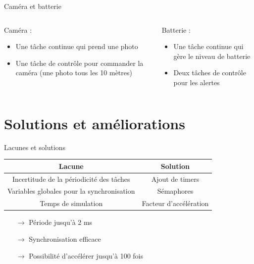 \documentclass{beamer}
\begin{document}
\begin{frame}{Caméra et batterie}

    \begin{columns}
    
        \begin{column}{0.45\paperwidth}
            Caméra :
            \begin{itemize}
                \item Une tâche continue qui prend une photo
                \item Une tâche de contrôle pour commander la caméra (une photo tous les 10 mètres)
            \end{itemize}
        \end{column}
        
        \begin{column}{0.45\paperwidth}
            Batterie :
            \begin{itemize}
                \item Une tâche continue qui gère le niveau de batterie
                \item Deux tâches de contrôle pour les alertes
            \end{itemize}
        \end{column}
    
    \end{columns}

\end{frame}

\section{Solutions et améliorations}

\begin{frame}{Lacunes et solutions}
    
    \begin{tabular}{|c|c|}
        \hline
        \textbf{Lacune} & \textbf{Solution} \\
        \hline
        Incertitude de la périodicité des tâches
 & Ajout de timers \\
        \hline
        Variables globales pour la synchronisation & Sémaphores \\
        \hline
        Temps de simulation & Facteur d'accélération \\
        \hline
    \end{tabular}
    
    \bigskip
    
    \begin{itemize}
        \item[$\rightarrow$] Période jusqu'à 2 ms
        \item[$\rightarrow$] Synchronisation efficace
        \item[$\rightarrow$] Possibilité d'accélérer jusqu'à 100 fois 
    \end{itemize}
    
\end{frame}
\end{document}

